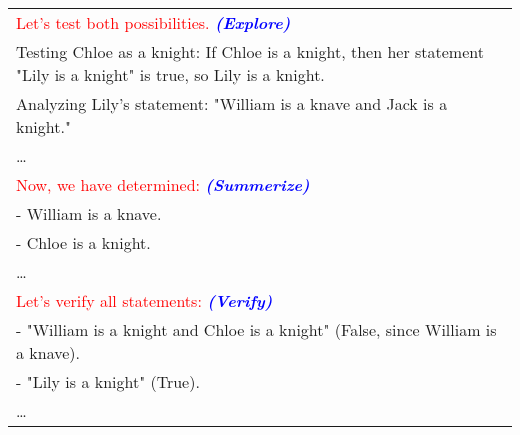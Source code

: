 \begin{table}[H]
\begin{tabular}{p{14cm}}
\textcolor{red}{Let's test both possibilities.}\textcolor{blue}{\textit{\textbf{ (Explore)}}}\\
Testing Chloe as a knight: If Chloe is a knight, then her statement "Lily is a knight" is true, so Lily is a knight. \\
Analyzing Lily's statement: "William is a knave and Jack is a knight." \\
\ldots \\

\textcolor{red}{Now, we have determined:}\textcolor{blue}{\textit{\textbf{ (Summerize)}}} \\
- William is a knave. \\
- Chloe is a knight. \\
\ldots \\
\textcolor{red}{Let's verify all statements:} \textcolor{blue}{\textit{\textbf{ (Verify)}}} \\
- "William is a knight and Chloe is a knight" (False, since William is a knave). \\
- "Lily is a knight" (True). \\
\ldots \\

\end{tabular}
\end{table}
